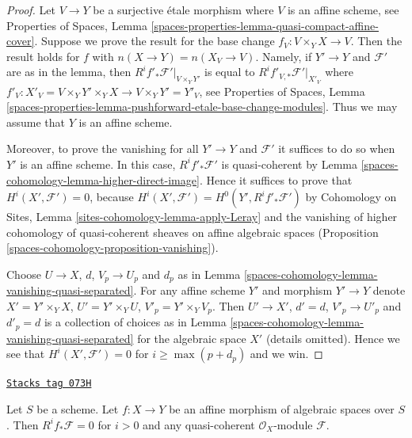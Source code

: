 \begin{proof}
Let $V \to Y$ be a surjective \'etale morphism where $V$ is an affine
scheme, see
Properties of Spaces, Lemma
\ref{spaces-properties-lemma-quasi-compact-affine-cover}.
Suppose we prove the result for the base change $f_V : V \times_Y X \to V$.
Then the result holds for $f$ with $n(X \to Y) = n(X_V \to V)$.
Namely, if $Y' \to Y$ and $\mathcal{F}'$ are as in the lemma, then
$R^if'_*\mathcal{F}'|_{V \times_Y Y'}$ is equal to
$R^if'_{V, *}\mathcal{F}'|_{X'_V}$ where
$f'_V : X'_V = V \times_Y Y' \times_Y X \to V \times_Y Y' = Y'_V$, see
Properties of Spaces,
Lemma \ref{spaces-properties-lemma-pushforward-etale-base-change-modules}.
Thus we may assume that $Y$ is an affine scheme.

\medskip\noindent
Moreover, to prove the vanishing for all $Y' \to Y$ and
$\mathcal{F}'$ it suffices to do so when $Y'$ is an affine scheme.
In this case, $R^if'_*\mathcal{F}'$ is quasi-coherent by
Lemma \ref{spaces-cohomology-lemma-higher-direct-image}.
Hence it suffices to prove that $H^i(X', \mathcal{F}') = 0$, because
$H^i(X', \mathcal{F}') = H^0(Y', R^if'_*\mathcal{F}')$ by
Cohomology on Sites, Lemma \ref{sites-cohomology-lemma-apply-Leray}
and the vanishing of higher cohomology of quasi-coherent sheaves
on affine algebraic spaces
(Proposition \ref{spaces-cohomology-proposition-vanishing}).

\medskip\noindent
Choose $U \to X$, $d$, $V_p \to U_p$ and $d_p$ as in
Lemma \ref{spaces-cohomology-lemma-vanishing-quasi-separated}.
For any affine scheme $Y'$ and morphism $Y' \to Y$ denote
$X' = Y' \times_Y X$, $U' = Y' \times_Y U$, $V'_p = Y' \times_Y V_p$.
Then $U' \to X'$, $d' = d$, $V'_p \to U'_p$ and $d'_p = d$
is a collection of choices as in
Lemma \ref{spaces-cohomology-lemma-vanishing-quasi-separated}
for the algebraic space $X'$ (details omitted).
Hence we see that $H^i(X', \mathcal{F}') = 0$ for $i \geq \max(p + d_p)$
and we win.
\end{proof}

\begin{lemma}
\label{spaces-cohomology-lemma-affine-vanishing-higher-direct-images}
\href{https://stacks.math.columbia.edu/tag/073H}{\texttt{Stacks tag 073H}}

Let $S$ be a scheme. Let $f : X \to Y$ be an affine
morphism of algebraic spaces over $S$. Then
$R^if_*\mathcal{F} = 0$ for $i > 0$ and any quasi-coherent
$\mathcal{O}_X$-module $\mathcal{F}$.
\end{lemma}


